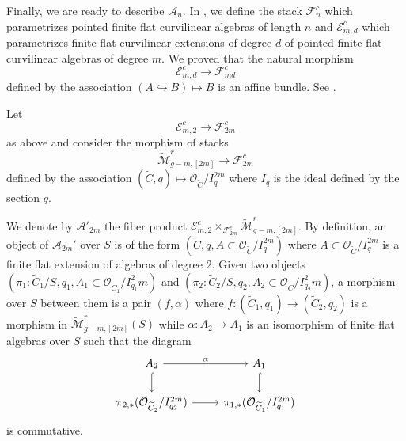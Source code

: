 \documentclass{alggeom}
\numberwithin{equation}{section}
\numberwithin{subsection}{section}
\theoremstyle{definition}
\theoremstyle{remark}
\newcommand\cA{\mathcal{A}} \newcommand\cB{\mathcal{B}}
\newcommand\cE{\mathcal{E}} \newcommand\cF{\mathcal{F}}
\newcommand\cO{\mathcal{O}} \newcommand\cP{\mathcal{P}}
\newcommand\into{\hookrightarrow}
\newcommand{\Mtilde}{\widetilde{\mathcal M}}
\begin{document}
Finally, we are ready to describe $\cA_n$. In , we define the stack $\cF_n^c$ which parametrizes pointed finite flat curvilinear algebras of length $n$ and $\cE_{m,d}^c$ which parametrizes finite flat curvilinear extensions of degree $d$ of pointed finite flat curvilinear algebras of degree $m$. We proved that the natural morphism 
$$ \cE_{m,d}^c \longrightarrow \cF_{md}^c$$
defined by the association $(A\into B) \mapsto B$ is an affine bundle. See . 

Let 
$$ \cE_{m,2}^c\longrightarrow \cF_{2m}^c$$
as above and consider the morphism of stacks
$$ \Mtilde_{g-m,[2m]}^r\longrightarrow \cF_{2m}^c$$ 
defined by the association $(\widetilde{C},q) \mapsto \cO_{\widetilde{C}}/I_q^{2m}$ where $I_q$ is the ideal defined by the section $q$. 

We denote by $\cA'_{2m}$ the fiber product $\cE_{m,2}^c \times_{\cF_{2m}^c} \Mtilde_{g-m,[2m]}^r$. By definition, an object of $\cA_{2m}'$ over $S$ is of the form $(\widetilde{C},q, A \subset \cO_{\widetilde{C}}/I_q^{2m})$ where $A \subset \cO_{\widetilde{C}}/I_q^{2m}$ is a finite flat extension of algebras of degree $2$. Given two objects $(\pi_1:\widetilde{C}_1/S,q_1, A_1 \subset \cO_{\widetilde{C}_1}/I_{q_1}^2m)$ and $(\pi_2:\widetilde{C}_2/S,q_2, A_2 \subset \cO_{\widetilde{C}}/I_{q_2}^2m)$, a morphism over $S$ between them is a pair $(f,\alpha)$ where $f:(\widetilde{C}_1,q_1)\rightarrow (\widetilde{C}_2,q_2)$  is a morphism in $\Mtilde_{g-m,[2m]}^r(S)$ while $\alpha:A_2 \rightarrow A_1$ is an isomorphism of finite flat algebras over $S$ such that the diagram 
$$
\begin{tikzcd}
	A_2 \arrow[r, "\alpha"] \arrow[d, hook]            & A_1 \arrow[d, hook]                        \\
	\pi_{2,*}(\cO_{\widetilde{C}_2}/I_{q_2}^{2m}) \arrow[r] & \pi_{1,*}(\cO_{\widetilde{C}_1}/I_{q_1}^{2m})
\end{tikzcd}
$$
is commutative. 
\end{document}
